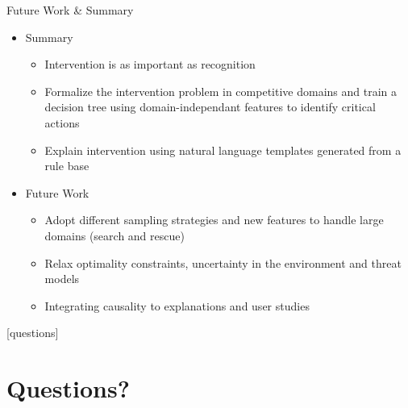 \begin{frame}{Future Work \& Summary}
	\begin{itemize}
	
	\item Summary
		\begin{itemize}
		\item Intervention is as important as recognition
		\item Formalize the intervention problem in competitive domains and train a decision tree using domain-independant features to identify critical actions
		\item Explain intervention using natural language templates generated from a rule base
		\end{itemize}
		
		\item Future Work
		\begin{itemize}
			\item Adopt different sampling strategies and new features to handle large domains (search and rescue)
			\item Relax optimality constraints, uncertainty in the environment and threat models
			\item Integrating causality to explanations and user studies
		\end{itemize}
		
	\end{itemize}
	
\end{frame}

	


[questions]
\section{Questions?}